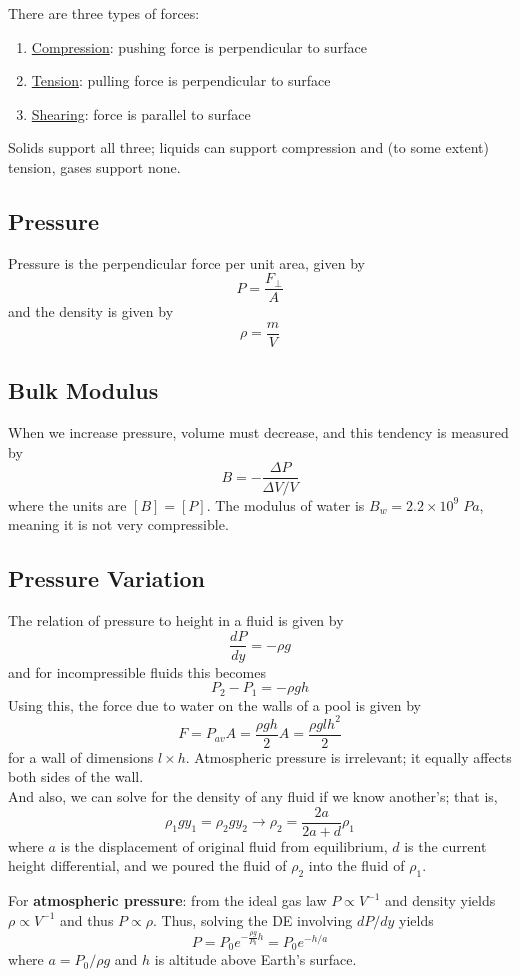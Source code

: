 \documentclass[../PhysicsFormulae.tex]{subfiles}
\begin{document}
There are three types of forces:
\begin{enumerate}
\item \underline{Compression}: pushing force is perpendicular to surface
\item \underline{Tension}: pulling force is perpendicular to surface
\item \underline{Shearing}: force is parallel to surface
\end{enumerate}
Solids support all three; liquids can support compression and (to some extent) tension, gases support none.

\subsection{Pressure}
Pressure is the perpendicular force per unit area, given by
\[ P = \frac{F_{\perp}}{A} \]
and the density is given by
\[ \rho = \frac{m}{V} \] 

\subsection{Bulk Modulus}
When we increase pressure, volume must decrease, and this tendency is measured by
\[ B = -\frac{\Delta P}{\Delta V / V} \]
where the units are $[B] = [P]$. The modulus of water is $B_w = 2.2 \times 10^9 \; Pa$, meaning it is not very compressible. 

\subsection{Pressure Variation}
The relation of pressure to height in a fluid is given by
\[ \frac{dP}{dy} = - \rho g \]
and for incompressible fluids this becomes
\[ P_2 - P_1 = -\rho g h \]
Using this, the force due to water on the walls of a pool is given by
\[ F = P_{av}A = \frac{\rho gh}{2} A = \frac{\rho g l h^2 }{2} \]
for a wall of dimensions $l \times h $. Atmospheric pressure is irrelevant; it equally affects both sides of the wall. \\
And also, we can solve for the density of any fluid if we know another's; that is, 
\[ \rho_1gy_1 = \rho_2gy_2 \rightarrow \rho_2 = \frac{2a}{2a+d}\rho_1 \]
where $a$ is the displacement of original fluid from equilibrium, $d$ is the current height differential, and we poured the fluid of $\rho_2$ into the fluid of $\rho_1$. \bigskip

For \textbf{atmospheric pressure}: from the ideal gas law $P \propto V^{-1}$ and density yields $\rho \propto V^{-1}$ and thus $P \propto \rho$. Thus, solving the DE involving $dP/dy$ yields
\[ P = P_0 e^{-\frac{\rho g}{P_0} h} = P_0 e^{-h/a} \]
where $a = P_0/\rho g$ and $h$ is altitude above Earth's surface. 
\end{document}
